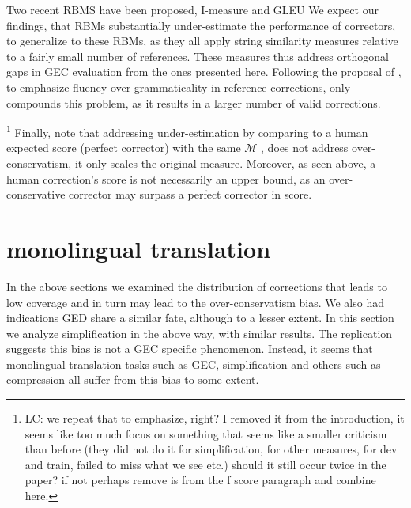\documentclass[letterpaper, 11pt]{article}
\newcommand{\lc}[1]{\footnote{\color{blue}LC: #1}}
\begin{document}
Two recent RBMS have been proposed, {\sc I-measure} \cite{felice2015towards} and GLEU \cite{napoles2015ground}
We expect our findings, that RBMs substantially under-estimate the performance of correctors, to generalize to these RBMs, as they all
apply string similarity measures relative to a fairly small number of references.
These measures thus address orthogonal gaps in GEC evaluation from the ones presented here.
Following the proposal of , to emphasize fluency over grammaticality in reference corrections, only compounds this problem, as it results in a larger number of valid corrections.

\lc{we repeat that to emphasize, right? I removed it from the introduction, it seems like too much focus on something that seems like a smaller criticism than before (they did not do it for simplification, for other measures, for dev and train, failed to miss what we see etc.) should it still occur twice in the paper? if not perhaps remove is from the f score paragraph and combine here.}
Finally, note that addressing under-estimation by comparing to
a human expected score (perfect corrector) with the same $\mathcal{M}$ \cite{bryant2015far},
does not address over-conservatism, it only scales the original measure. Moreover, as seen above, a human correction's score
is not necessarily an upper bound, as an over-conservative corrector may surpass a perfect corrector in score.

\section{monolingual translation}\label{sec:simplification}
In the above sections we examined the distribution of corrections that leads to low coverage and in turn may lead to the over-conservatism bias. We also had indications GED share a similar fate, although to a lesser extent. In this section we analyze simplification in the above way, with similar results. The replication suggests this bias is not a GEC specific phenomenon. Instead, it seems that monolingual translation tasks such as GEC, simplification and others such as compression all suffer from this bias to some extent.
\end{document}
